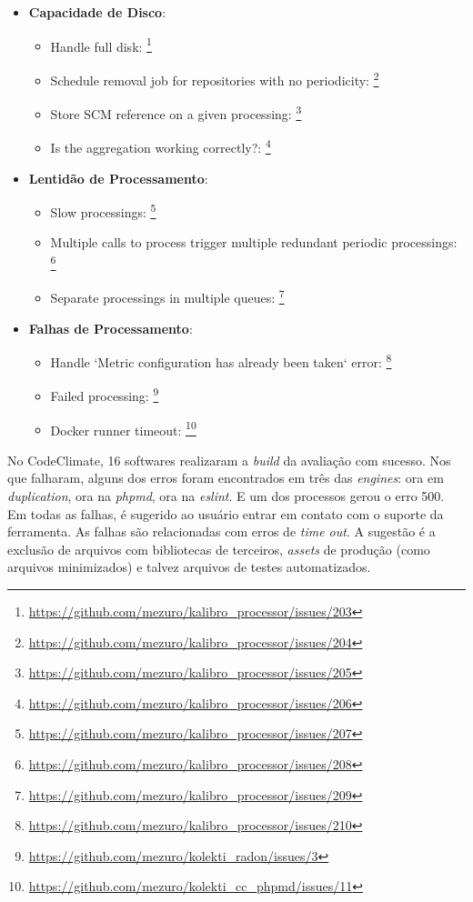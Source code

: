 \begin{itemize}
  \item \textbf{Capacidade de Disco}:
    \begin{itemize}
      \item Handle full disk: \footnote{\url{https://github.com/mezuro/kalibro\_processor/issues/203}}
      \item Schedule removal job for repositories with no periodicity:
            \footnote{\url{https://github.com/mezuro/kalibro\_processor/issues/204}}
      \item Store SCM reference on a given processing:
            \footnote{\url{https://github.com/mezuro/kalibro\_processor/issues/205}}
      \item Is the aggregation working correctly?:
            \footnote{\url{https://github.com/mezuro/kalibro\_processor/issues/206}}
    \end{itemize}
  \item \textbf{Lentidão de Processamento}:
    \begin{itemize}
      \item Slow processings: \footnote{\url{https://github.com/mezuro/kalibro\_processor/issues/207}}
      \item Multiple calls to process trigger multiple redundant periodic processings:
            \footnote{\url{https://github.com/mezuro/kalibro\_processor/issues/208}}
      \item Separate processings in multiple queues:
            \footnote{\url{https://github.com/mezuro/kalibro\_processor/issues/209}}
    \end{itemize}
  \item \textbf{Falhas de Processamento}:
    \begin{itemize}
      \item Handle `Metric configuration has already been taken` error:
            \footnote{\url{https://github.com/mezuro/kalibro\_processor/issues/210}}
      \item Failed processing: \footnote{\url{https://github.com/mezuro/kolekti\_radon/issues/3}}
      \item Docker runner timeout: \footnote{\url{https://github.com/mezuro/kolekti\_cc\_phpmd/issues/11}}
    \end{itemize}
\end{itemize}

No CodeClimate, 16 softwares realizaram a \textit{build} da avaliação com
sucesso. Nos que falharam, alguns dos erros foram encontrados em três das
\textit{engines}: ora em \textit{duplication}, ora na \textit{phpmd}, ora na
\textit{eslint}. E um dos processos gerou o erro 500. Em todas as falhas, é
sugerido ao usuário entrar em contato com o suporte da ferramenta. As falhas
são relacionadas com erros de \textit{time out}. A sugestão é a exclusão de
arquivos com bibliotecas de terceiros, \textit{assets} de produção (como
arquivos minimizados) e talvez arquivos de testes automatizados.

